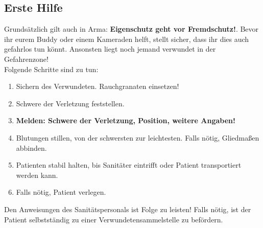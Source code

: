 \newpage
\subsection{Erste Hilfe}
Grundsätzlich gilt auch in Arma: \textbf{Eigenschutz geht vor Fremdschutz!}. Bevor ihr eurem Buddy oder einem Kameraden helft, stellt sicher, dass ihr dies auch gefahrlos tun könnt. Ansonsten liegt noch jemand verwundet in der Gefahrenzone!\\
Folgende Schritte sind zu tun:
\begin{enumerate}
	\item Sichern des Verwundeten. Rauchgranaten einsetzen!
	\item Schwere der Verletzung feststellen.
	\item \textbf{Melden: Schwere der Verletzung, Position, weitere Angaben!}
	\item Blutungen stillen, von der schwersten zur leichtesten. Falls nötig, Gliedmaßen abbinden.
	\item Patienten stabil halten, bis Sanitäter eintrifft oder Patient transportiert werden kann.
	\item Falls nötig, Patient verlegen.
\end{enumerate}
Den Anweisungen des Sanitätspersonals ist Folge zu leisten! Falls nötig, ist der Patient selbstständig zu einer Verwundetensammelstelle zu befördern.